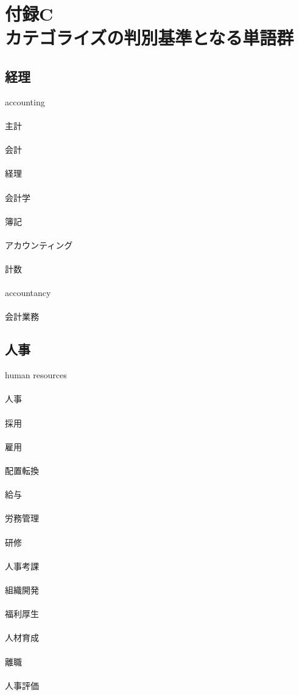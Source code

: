 \chapter*{付録C\\カテゴライズの判別基準となる単語群}

\setlength{\parindent}{0pt}

\section*{経理}
accounting
\\\\
主計
\\\\
会計
\\\\
経理
\\\\
会計学
\\\\
簿記
\\\\
アカウンティング
\\\\
計数
\\\\
accountancy
\\\\
会計業務

\clearpage
\section*{人事}
human resources
\\\\
人事
\\\\
採用
\\\\
雇用
\\\\
配置転換
\\\\
給与
\\\\
労務管理
\\\\
研修
\\\\
人事考課
\\\\
組織開発
\\\\
福利厚生
\\\\
人材育成
\\\\
離職
\\\\
人事評価

